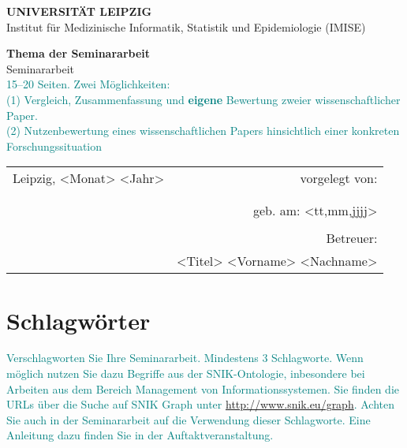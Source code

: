 \documentclass[headsepline,titlepage,twoside,12pt]{report}
\author{Vorname Name}
\newcommand\todo[1]{\textcolor{teal}{#1}}%
\begin{document}
\allowdisplaybreaks%

\onehalfspace

\begin{titlepage}
\thispagestyle{empty}
\begin{center}

{\large\bf UNIVERSITÄT LEIPZIG\\[1mm]}
Institut für Medizinische Informatik, Statistik und Epidemiologie (IMISE)

\vspace*{4cm}

{\Huge\textbf{Thema der Seminararbeit}\\}
\vspace{0.5cm}
{\large Seminararbeit}\\
\vspace{2cm}
\todo{15--20 Seiten. Zwei Möglichkeiten:\\
(1) Vergleich, Zusammenfassung und \textbf{eigene} Bewertung zweier wissenschaftlicher Paper.\\
(2) Nutzenbewertung eines wissenschaftlichen Papers hinsichtlich einer konkreten Forschungssituation
}

\vspace*{4cm}

\begin{tabularx}{\textwidth}{lr}
Leipzig, <Monat> <Jahr>		&vorgelegt von:\\
\\
				&\makeatletter \@author \makeatother\\
				&geb. am: <tt,mm,jjjj>\\
\\
				&Betreuer:\\
				&<Titel> <Vorname> <Nachname>\\
\end{tabularx}
\vspace{1cm}

\end{center}
\end{titlepage}

\tableofcontents
\newpage

\section*{Schlagwörter}
\todo{
Verschlagworten Sie Ihre Seminararbeit.
Mindestens 3 Schlagworte.
Wenn möglich nutzen Sie dazu Begriffe aus der SNIK-Ontologie, inbesondere bei Arbeiten aus dem Bereich Management von Informationssystemen.
Sie finden die URLs über die Suche auf SNIK Graph unter \url{http://www.snik.eu/graph}.
Achten Sie auch in der Seminararbeit auf die Verwendung dieser Schlagworte.
Eine Anleitung dazu finden Sie in der Auftaktveranstaltung.
}
\end{document}
